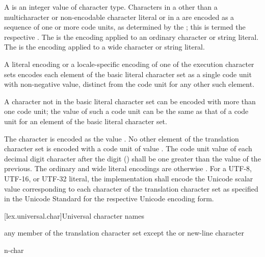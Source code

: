 \pnum
A  is an integer value
of character type.
Characters in a 
other than a multicharacter or non-encodable character literal or
in a  are encoded as
a sequence of one or more code units, as determined
by the ;
this is termed the respective .
The  is
the encoding applied to an ordinary character or string literal.
The  is the encoding applied
to a wide character or string literal.

\pnum
A literal encoding or a locale-specific encoding of one of
the execution character sets
encodes each element of the basic literal character set as
a single code unit with non-negative value,
distinct from the code unit for any other such element.
\begin{note}
A character not in the basic literal character set
can be encoded with more than one code unit;
the value of such a code unit can be the same as
that of a code unit for an element of the basic literal character set.
\end{note}
%
%
The  character is encoded as the value .
No other element of the translation character set
is encoded with a code unit of value .
The code unit value of each decimal digit character after the digit  ()
shall be one greater than the value of the previous.
The ordinary and wide literal encodings are otherwise
.
%
%
%
For a UTF-8, UTF-16, or UTF-32 literal,
the implementation shall encode
the Unicode scalar value
corresponding to each character of the translation character set
as specified in the Unicode Standard
for the respective Unicode encoding form.

[lex.universal.char]{Universal character names}

\begin{bnf}
\br
     \textnormal{any member of the translation character set except the  or new-line character}
\end{bnf}

\begin{bnf}
\br
    n-char 
\end{bnf}

